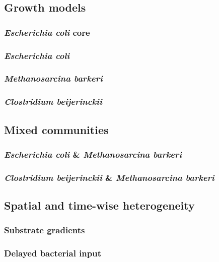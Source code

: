 \subsection{Growth models}
\subsubsection{\textit{Escherichia coli} core}
\subsubsection{\textit{Escherichia coli}}
\subsubsection{\textit{Methanosarcina barkeri}}
\subsubsection{\textit{Clostridium beijerinckii}}

\subsection{Mixed communities}
\subsubsection{\textit{Escherichia coli} \& \textit{Methanosarcina barkeri}}
\subsubsection{\textit{Clostridium beijerinckii} \& \textit{Methanosarcina barkeri}}

\subsection{Spatial and time-wise heterogeneity}
\subsubsection{Substrate gradients}
\subsubsection{Delayed bacterial input}
